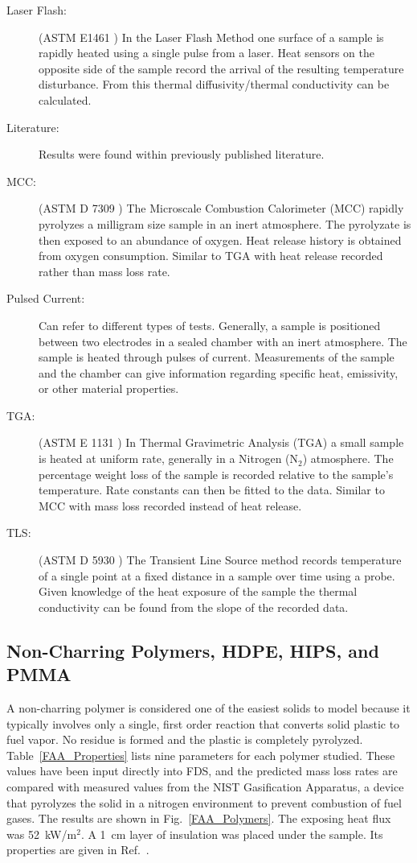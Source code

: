 \begin{description}
\item[Laser Flash:] (ASTM E1461 \cite{laserflash}) In the Laser Flash Method one surface of a sample is rapidly heated using a single pulse from a laser. Heat sensors on the opposite side of the sample record the arrival of the resulting temperature disturbance. From this thermal diffusivity/thermal conductivity can be calculated.
\item[Literature:] Results were found within previously published literature.
\item[MCC:] (ASTM D 7309 \cite{microcc}) The Microscale Combustion Calorimeter (MCC)  rapidly pyrolyzes a milligram size sample in an inert atmosphere. The pyrolyzate is then exposed to an abundance of oxygen.  Heat release history is obtained from oxygen consumption. Similar to TGA with  heat release recorded rather than mass loss rate.
\item[Pulsed Current:] Can refer to different types of tests. Generally, a sample is positioned between two electrodes in a sealed chamber with an inert atmosphere. The sample is heated through pulses of current. Measurements of the sample and the chamber can give information regarding specific heat, emissivity, or other material properties.
\item[TGA:] (ASTM E 1131 \cite{thermalga}) In Thermal Gravimetric Analysis (TGA)  a small sample is heated at uniform rate, generally in a Nitrogen (N$_2$) atmosphere. The percentage weight loss of the sample is recorded relative to the sample's temperature. Rate constants can then be fitted to the data. Similar to MCC with mass loss recorded instead of heat release.
\item[TLS:] (ASTM D 5930 \cite{transline}) The Transient Line Source method records temperature of a single point at a fixed distance in a sample over time using a probe. Given knowledge of the heat exposure of the sample the thermal conductivity can be found from the slope of the recorded data.
\end{description}



\newpage

\subsection{Non-Charring Polymers, HDPE, HIPS, and PMMA}

A non-charring polymer is considered one of the easiest solids to model because it typically involves only a single, first order reaction that converts solid plastic to fuel vapor. No residue is formed and the plastic is completely pyrolyzed. Table~\ref{FAA_Properties} lists nine parameters for each polymer studied. These values have been input directly into FDS, and the predicted mass loss rates are compared with measured values from the NIST Gasification Apparatus, a device that pyrolyzes the solid in a nitrogen environment to prevent combustion of fuel gases. The results are shown in Fig.~\ref{FAA_Polymers}. The exposing heat flux was 52~kW/m$^2$. A 1~cm layer of insulation was placed under the sample. Its properties are given in Ref.~\cite{Stoliarov:CF2009}.

